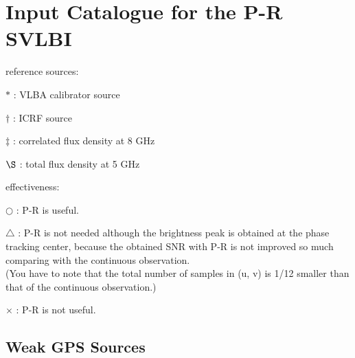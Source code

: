 \section{
  \label{sec:03}
  Input Catalogue for the P-R SVLBI
}
reference sources:
    \begin{list}{}
    {
        \setlength{\itemindent}{-6mm}
        \setlength{\parsep}{0mm}
        \setlength{\topsep}{3mm}
    }
    \item{}$*$ : VLBA calibrator source
    \item{}$\dag$ : ICRF source 
    \item{}$\ddag$ : correlated flux density at 8 GHz
    \item{}$\S$ : total flux density at 5 GHz
    \end{list}
effectiveness: 
    \begin{list}{}
    {
        \setlength{\itemindent}{-6mm}
        \setlength{\parsep}{0mm}
        \setlength{\topsep}{3mm}
    }
    \item{}$\bigcirc$ : P-R is useful. 
    \item{}$\triangle$ : P-R is not needed although the 
       brightness peak is obtained at the phase tracking center, 
       because the obtained SNR with P-R is not improved so much 
       comparing with the continuous observation. \\
       (You have to note that the total number of samples in (u, v) 
       is 1/12 smaller than that of the continuous observation.) 
    \item{} $\times$ : P-R is not useful. 
    \end{list}

\subsection{
  Weak GPS Sources
}
